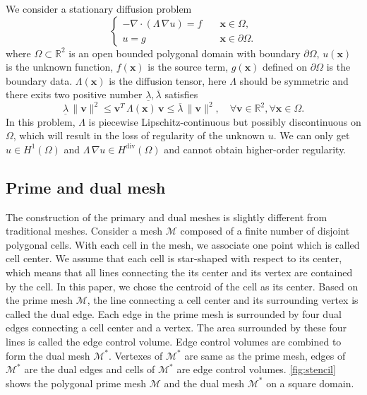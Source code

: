 \documentclass[times,review,preprint,authoryear]{elsarticle}
\newcommand{\bx}{\mathbf{x}}
\begin{document}
We consider a stationary diffusion problem
\begin{equation}\label{eq:prob}
\left\{
\begin{aligned}
- \nabla \cdot (\Lambda \, \nabla u) = f & \quad \bx \in \Omega, \\
u = g & \quad \bx \in \partial \Omega.
\end{aligned}
\right.
\end{equation}
where $\Omega \subset \mathbb{R}^2$ is an open bounded polygonal domain with boundary $\partial \Omega$, $u(\bx)$ is the unknown function, $f(\bx)$ is the source term, $g(\bx)$ defined on $\partial \Omega$ is the boundary data. $\Lambda(\bx)$ is the diffusion tensor, here $\Lambda$ should be symmetric and there exits two positive number $\underline{\lambda}, \overline{\lambda}$ satisfies
\begin{equation*}
\underline{\lambda} \, \|\mathbf{v}\|^2 \leq \mathbf{v}^T \, \Lambda(\bx) \, \mathbf{v} \leq \overline{\lambda} \, \|\mathbf{v}\|^2, \quad \forall \mathbf{v} \in \mathbb{R}^2, \forall \bx \in \Omega.
\end{equation*}
In this problem, $\Lambda$ is piecewise Lipschitz-continuous but possibly discontinuous on $\Omega$, which will result in the loss of regularity of the unknown $u$. We can only get $u \in H^1(\Omega)$ and  $\Lambda \, \nabla u \in H^{\text{div}}(\Omega)$ and cannot obtain higher-order regularity.

\subsection{Prime and dual mesh}\label{sec:mesh}

The construction of the primary and dual meshes is slightly different from traditional meshes.
Consider a mesh $\mathcal{M}$ composed of a finite number of disjoint polygonal cells. With each cell in the mesh, we associate one point which is called cell center. We assume that each cell is star-shaped with respect to its center, which means that all lines connecting the its center and its vertex are contained by the cell. In this paper, we chose the centroid of the cell as its center.
Based on the prime mesh $\mathcal{M}$, the line connecting a cell center and its surrounding vertex is called the dual edge. Each edge in the prime mesh is surrounded by four dual edges connecting a cell center and a vertex. The area surrounded by these four lines is called the edge control volume. Edge control volumes are combined to form the dual mesh $\mathcal{M}^*$.
Vertexes of $\mathcal{M}^*$ are same as the prime mesh, edges of $\mathcal{M}^*$ are the dual edges and cells of $\mathcal{M}^*$ are edge control volumes. \cref{fig:stencil} shows the polygonal prime mesh $\mathcal{M}$ and the dual mesh $\mathcal{M}^*$ on a square domain.
\end{document}
